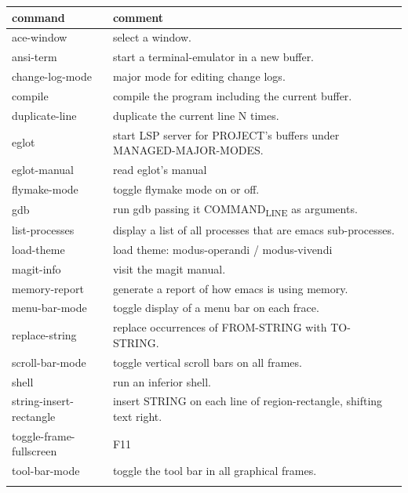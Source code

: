 \documentclass[11pt]{article}
\author{jaloo}
\date{\today}
\title{}
\begin{document}
\tableofcontents

\begin{center}
\begin{tabular}{ll}
command & comment\\
\hline
ace-window & select a window.\\
ansi-term & start a terminal-emulator in a new buffer.\\
change-log-mode & major mode for editing change logs.\\
compile & compile the program including the current buffer.\\
duplicate-line & duplicate the current line N times.\\
eglot & start LSP server for PROJECT's buffers under MANAGED-MAJOR-MODES.\\
eglot-manual & read eglot's manual\\
flymake-mode & toggle flymake mode on or off.\\
gdb & run gdb passing it COMMAND\textsubscript{LINE} as arguments.\\
list-processes & display a list of all processes that are emacs sub-processes.\\
load-theme & load theme: modus-operandi / modus-vivendi\\
magit-info & visit the magit manual.\\
memory-report & generate a report of how emacs is using memory.\\
menu-bar-mode & toggle display of a menu bar on each frace.\\
replace-string & replace occurrences of FROM-STRING with TO-STRING.\\
scroll-bar-mode & toggle vertical scroll bars on all frames.\\
shell & run an inferior shell.\\
string-insert-rectangle & insert STRING on each line of region-rectangle, shifting text right.\\
toggle-frame-fullscreen & F11\\
tool-bar-mode & toggle the tool bar in all graphical frames.\\
 & \\
\end{tabular}
\end{center}
\end{document}
